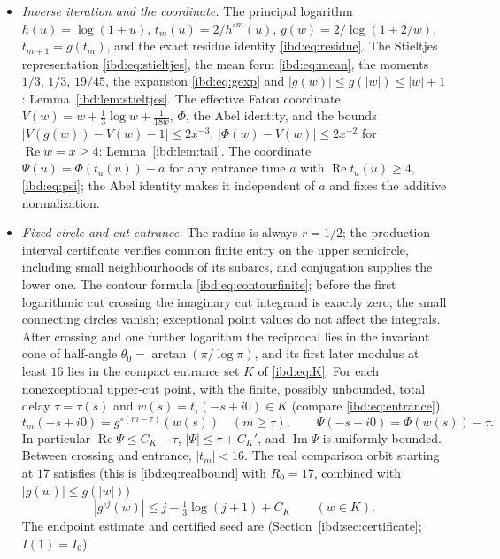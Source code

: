 \documentclass[11pt,letterpaper]{article}
\theoremstyle{remark}\newtheorem{remark}[theorem]{Remark}
\DeclareMathOperator{\Rea}{Re}
\DeclareMathOperator{\Ima}{Im}
\begin{document}
\begin{itemize}
\item \emph{Inverse iteration and the coordinate.} The principal logarithm $h(u)=\log(1+u)$, $t_m(u)=2/h^{\circ m}(u)$, $g(w)=2/\log(1+2/w)$, $t_{m+1}=g(t_m)$, and the exact residue identity \eqref{ibd:eq:residue}. The Stieltjes representation \eqref{ibd:eq:stieltjes}, the mean form \eqref{ibd:eq:mean}, the moments $1/3$, $1/3$, $19/45$, the expansion \eqref{ibd:eq:gexp} and $|g(w)|\le g(|w|)\le|w|+1$: Lemma~\ref{ibd:lem:stieltjes}. The effective Fatou coordinate $V(w)=w+\frac13\log w+\frac1{18w}$, $\Phi$, the Abel identity, and the bounds $|V(g(w))-V(w)-1|\le2x^{-3}$, $|\Phi(w)-V(w)|\le2x^{-2}$ for $\Rea w=x\ge4$: Lemma~\ref{ibd:lem:tail}. The coordinate $\Psi(u)=\Phi(t_a(u))-a$ for any entrance time $a$ with $\Rea t_a(u)\ge4$, \eqref{ibd:eq:psi}; the Abel identity makes it independent of $a$ and fixes the additive normalization.
\item \emph{Fixed circle and cut entrance.} The radius is always $r=1/2$; the production interval certificate verifies common finite entry on the upper semicircle, including small neighbourhoods of its subarcs, and conjugation supplies the lower one. The contour formula \eqref{ibd:eq:contourfinite}; before the first logarithmic cut crossing the imaginary cut integrand is exactly zero; the small connecting circles vanish; exceptional point values do not affect the integrals. After crossing and one further logarithm the reciprocal lies in the invariant cone of half-angle $\theta_0=\arctan(\pi/\log\pi)$, and its first later modulus at least $16$ lies in the compact entrance set $K$ of \eqref{ibd:eq:K}. For each nonexceptional upper-cut point, with the finite, possibly unbounded, total delay $\tau=\tau(s)$ and $w(s)=t_\tau(-s+i0)\in K$ (compare \eqref{ibd:eq:entrance}),
\begin{equation}\label{ibd:pd:eq:entry}
 t_m(-s+i0)=g^{\circ(m-\tau)}(w(s))\quad(m\geq\tau),\qquad
 \Psi(-s+i0)=\Phi(w(s))-\tau.
\end{equation}
In particular $\Rea\Psi\leq C_K-\tau$, $|\Psi|\leq\tau+C_K'$, and $\Ima\Psi$ is uniformly bounded. Between crossing and entrance, $|t_m|<16$. The real comparison orbit starting at $17$ satisfies (this is \eqref{ibd:eq:realbound} with $R_0=17$, combined with $|g(w)|\le g(|w|)$)
\begin{equation}\label{ibd:pd:eq:realbound}
 |g^{\circ j}(w)|\leq j-\tfrac13\log(j+1)+C_K\qquad(w\in K).
\end{equation}
The endpoint estimate and certified seed are (Section~\ref{ibd:sec:certificate}; $I(1)=I_0$)

\end{itemize}
\end{document}
